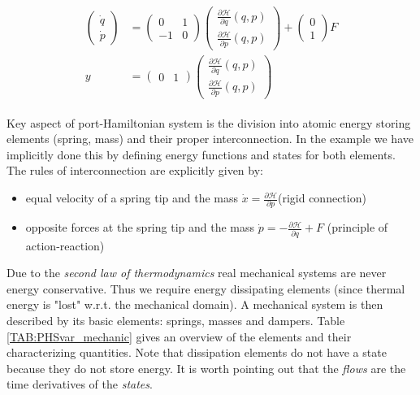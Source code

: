 \documentclass[a4paper,twoside, openright,12pt]{report}
\begin{document}
\begin{eqnarray}\label{EQ:HSexample}
\begin{aligned}
	\begin{pmatrix}\dot{q} \\ \dot{p}\end{pmatrix} &=
	\begin{pmatrix}0 & 1 \\ -1 & 0\end{pmatrix}
	\begin{pmatrix}\frac{\partial \mathcal{H}}{\partial q}(q,p) \\ \frac{\partial \mathcal{H}}{\partial p}(q,p)\end{pmatrix} + 
	\begin{pmatrix}0 \\ 1\end{pmatrix} F\\
	y &= \begin{pmatrix}	0 & 1\end{pmatrix}\begin{pmatrix}\frac{\partial \mathcal{H}}{\partial q}(q,p) \\ \frac{\partial \mathcal{H}}{\partial p}(q,p)\end{pmatrix}
	\end{aligned}
\end{eqnarray}
\newline
\vspace{10pt}%

Key aspect of port-Hamiltonian system is the division into atomic energy storing elements (spring, mass) and their proper interconnection. In the example we have implicitly done this by defining energy functions and states for both elements. The rules of interconnection are explicitly given by: 
\begin{itemize}
\itemsep0em
	\item equal velocity of a spring tip and the mass $\dot{x}=\frac{\partial \mathcal{H}}{\partial p}$(rigid connection)
	\item opposite forces at the spring tip and the mass $\dot{p}=-\frac{\partial \mathcal{H}}{\partial q}+F$ (principle of action-reaction) 
\end{itemize}

Due to the \emph{second law of thermodynamics} real mechanical systems are never energy conservative. Thus we require energy dissipating elements (since thermal energy is "lost" w.r.t. the mechanical domain). A mechanical system is then described by its basic elements: springs, masses and dampers. Table \ref{TAB:PHSvar_mechanic} gives an overview of the elements and their characterizing quantities. Note that dissipation elements do not have a state because they do not store energy. It is worth pointing out that the \emph{flows} are the time derivatives of the \emph{states}.    
\end{document}
